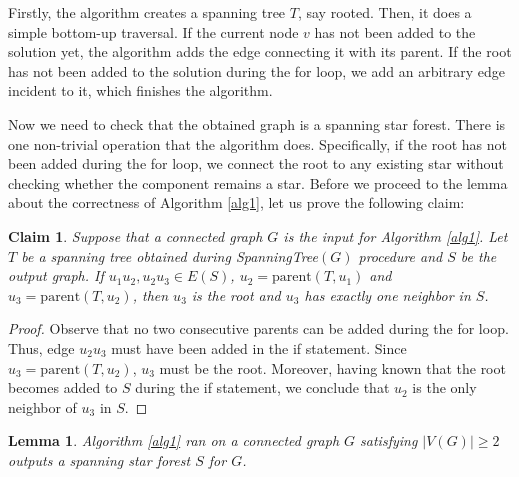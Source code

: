 \documentclass[en]{pracamgr}
\newtheorem{lemma}{Lemma}
\newtheorem{claim}{Claim}
\theoremstyle{definition}
\begin{document}
Firstly, the algorithm creates a spanning tree $T$, say rooted. Then, it does a simple bottom-up traversal. If the current node $v$ has not been added to the solution yet, the algorithm adds the edge connecting it with its parent. If the root has not been added to the solution during the for loop, we add an arbitrary edge incident to it, which finishes the algorithm.

Now we need to check that the obtained graph is a spanning star forest. There is one non-trivial operation that the algorithm does. Specifically, if the root has not  been added during the for loop, we connect the root to any existing star without checking whether the component remains a star. Before we proceed to the lemma about the correctness of Algorithm \ref{alg1}, let us prove the following claim:
\begin{claim}\label{ssf root}
	Suppose that a connected graph $G$ is the input for Algorithm \ref{alg1}. Let $T$ be a spanning tree obtained during \textrm{SpanningTree}$(G)$ procedure and $S$ be the output graph. If $u_1 u_2,u_2 u_3 \in E(S)$, $u_2 = \textrm{parent}(T,u_1)$ and $u_3=\textrm{parent}(T,u_2)$, then $u_3$ is the root and $u_3$ has exactly one neighbor in $S$.
\end{claim}

\begin{proof}
	Observe that no two consecutive parents can be added during the for loop. Thus, edge $u_2 u_3$ must have been added in the if statement. Since $u_3 = \textrm{parent}(T,u_2)$, $u_3$ must be the root. Moreover, having known that the root becomes added to $S$ during the if statement, we conclude that $u_2$ is the only neighbor of $u_3$ in $S$. 
\end{proof}

\begin{lemma}\label{alg1 correctness}
	Algorithm \ref{alg1} ran on a connected graph $G$ satisfying $|V(G)| \geq 2$ outputs a spanning star forest $S$ for $G$.
\end{lemma}
\end{document}

